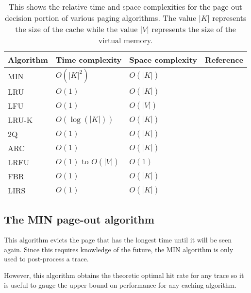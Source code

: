   \begin{table}
  \begin{tabular}{ | l | l | l | p{5cm} |}
    \hline
    Algorithm & Time complexity & Space complexity  &
      Reference \\ \hline
    MIN       & $O(|K|^2)$      & $O(|K|)$            &
      \cite{aho1971principles} \\ \hline
    LRU       & $O(1)$          & $O(|K|)$            &
      \cite{aho1971principles} \\ \hline
    LFU       & $O(1)$          & $O(|V|)$            &
      \cite{aho1971principles} \\ \hline
    LRU-K     & $O(\log(|K|))$   & $O(|K|)$            &
      \cite{o1993lru} \\ \hline
    2Q        & $O(1)$          & $O(|K|)$            &
      \cite{johnson1994x3} \\ \hline
    ARC       & $O(1)$          & $O(|K|)$            &
      \cite{arc} \\ \hline
    LRFU      & $O(1) \mbox{ to } O(|V|)$ & $O(1)$    &
      \cite{kim2001lrfu} \\ \hline
    FBR       & $O(1)$          & $O(|K|)$            &
      \cite{robinson1990data} \\ \hline
    LIRS      & $O(1)$          & $O(|K|)$            &
      \cite{jiang2002lirs} \\ \hline
  \end{tabular}
  \caption[Space and time complexity of caching algorithms]{
    This shows the relative time and space complexities for the page-out
    decision portion of various paging algorithms. The value $|K|$ represents
    the size of the cache while the value $|V|$ represents the size of the virtual
    memory.
  }
  \label{tab:complexity}
  \end{table}

\subsection{The MIN page-out algorithm}
  This algorithm evicts the page that has the longest time until it will be seen
  again. Since this requires knowledge of the future, the MIN algorithm is only
  used to post-process a trace.

  However, this algorithm obtains the theoretic optimal \cite{aho1971principles}
  hit rate for any trace so it is useful to gauge the upper bound on performance
  for any caching algorithm.

